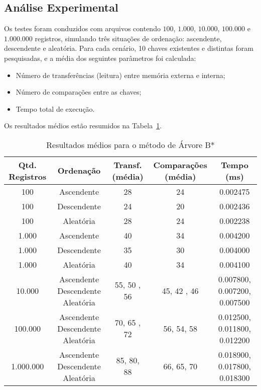 \documentclass[12pt,a4paper,brazil]{article}
\begin{document}
\subsection{Análise Experimental}

Os testes foram conduzidos com arquivos contendo $100$, $1.000$, $10.000$, $100.000$ e $1.000.000$ registros, simulando três situações de ordenação: ascendente, descendente e aleatória. Para cada cenário, 10 chaves existentes e distintas foram pesquisadas, e a média dos seguintes parâmetros foi calculada:

\begin{itemize}
  \item Número de transferências (leitura) entre memória externa e interna;
  \item Número de comparações entre as chaves;
  \item Tempo total de execução.
\end{itemize}

Os resultados médios estão resumidos na Tabela~\ref{tab:arvoreb-estrela-resultados}.

\begin{table}[H]
  \centering
  \caption{Resultados médios para o método de Árvore B*}
  \label{tab:arvoreb-estrela-resultados}
  \begin{tabular}{|c|c|c|c|c|}
    \hline
    \textbf{Qtd. Registros} & \textbf{Ordenação} & \textbf{Transf. (média)} & \textbf{Comparações (média)} & \textbf{Tempo (ms)} \\
    \hline
    100         & Ascendente  & 28	&   24	& 0.002475\\
    100         & Descendente & 24	& 20	& 0.002436
\\
    100         & Aleatória   & 28	& 24& 0.002238\\
    \hline
    1.000       & Ascendente  & 40& 34	& 0.004200\\
    1.000       & Descendente & 35	& 30& 0.004000
\\
    1.000       & Aleatória   & 40	& 34	& 0.004100\\
    \hline
    10.000      & Ascendente  
Descendente 
Aleatória   & 55, 50	, 56	& 45, 42	, 46	& 0.007800, 0.007200, 0.007500\\
    \hline
    100.000     & Ascendente  
Descendente 
Aleatória   & 70, 65	, 72& 56, 54, 58& 0.012500, 0.011800, 0.012200\\
    \hline
    1.000.000   & Ascendente  
Descendente 
Aleatória   & 85, 80, 88	& 66, 65, 70	& 0.018900, 0.017800, 0.018300

\\
    \hline
  \end{tabular}
\end{table}
\end{document}
